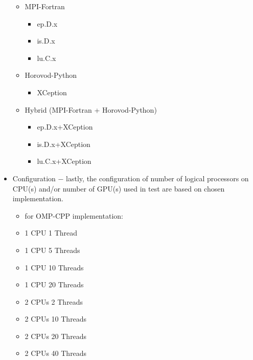 \begin{itemize}
        \begin{itemize}
            \item MPI-Fortran
            \begin{itemize}
                \item ep.D.x
                \item is.D.x
                \item lu.C.x
            \end{itemize}
        \end{itemize}
        \begin{itemize}
            \item Horovod-Python
            \begin{itemize}
                \item XCeption
            \end{itemize}
        \end{itemize}
        \begin{itemize}
            \item Hybrid (MPI-Fortran + Horovod-Python)
            \begin{itemize}
                \item ep.D.x+XCeption
                \item is.D.x+XCeption
                \item lu.C.x+XCeption
            \end{itemize}
        \end{itemize}
    \item Configuration $-$ lastly, the configuration of number of logical
    processors on CPU\@(s) and/or number of GPU\@(s) used in test are based on
    chosen implementation.
        \begin{itemize}
            \item for OMP-CPP implementation:
            \item 1 CPU 1 Thread
            \item 1 CPU 5 Threads
            \item 1 CPU 10 Threads
            \item 1 CPU 20 Threads
            \item 2 CPUs 2 Threads
            \item 2 CPUs 10 Threads
            \item 2 CPUs 20 Threads
            \item 2 CPUs 40 Threads
        \end{itemize}
        \begin{itemize}

\end{itemize}
\end{itemize}
